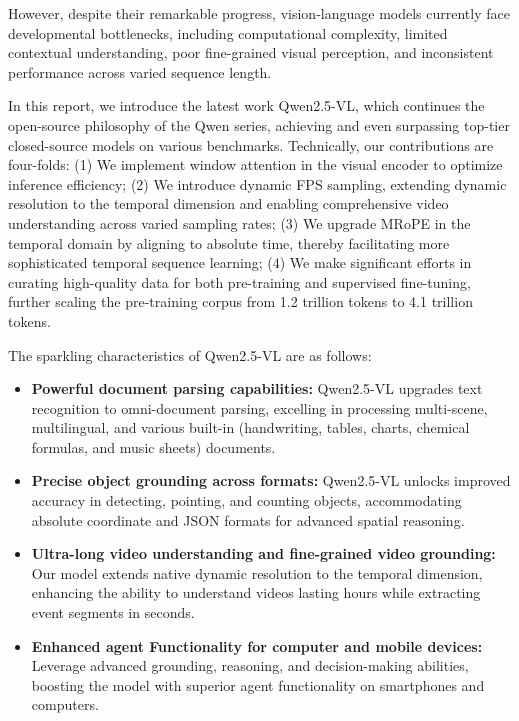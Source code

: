 However, despite their remarkable progress, vision-language models currently face developmental bottlenecks, including computational complexity,  limited contextual understanding, poor fine-grained visual perception, and inconsistent performance across varied sequence length.

In this report, we introduce the latest work Qwen2.5-VL, which continues the open-source philosophy of the Qwen series, achieving and even surpassing top-tier closed-source models on various benchmarks. Technically, our contributions are four-folds: (1) We implement window attention in the visual encoder to optimize inference efficiency; (2) We introduce dynamic FPS sampling, extending dynamic resolution to the temporal dimension and enabling comprehensive video understanding across varied sampling rates; (3) We upgrade MRoPE in the temporal domain by aligning to absolute time, thereby facilitating more sophisticated temporal sequence learning; (4) We make significant efforts in curating high-quality data for both pre-training and supervised fine-tuning, further scaling the pre-training corpus from 1.2 trillion tokens to 4.1 trillion tokens.

The sparkling characteristics of Qwen2.5-VL are as follows:
\begin{itemize}

 \item \textbf{Powerful document parsing capabilities:} Qwen2.5-VL upgrades text recognition to omni-document parsing, excelling in processing multi-scene, multilingual, and various built-in (handwriting, tables, charts, chemical formulas, and music sheets) documents.
 
 \item \textbf{Precise object grounding across formats:} Qwen2.5-VL unlocks improved accuracy in detecting, pointing, and counting objects, accommodating absolute coordinate and JSON formats for advanced spatial reasoning.
 
 \item \textbf{Ultra-long video understanding and fine-grained video grounding:} Our model extends native dynamic resolution to the temporal dimension, enhancing the ability to understand videos lasting hours while extracting event segments in seconds.
 
 \item \textbf{Enhanced agent Functionality for computer and mobile devices:} Leverage advanced grounding, reasoning, and decision-making abilities, boosting the model with superior agent functionality on smartphones and computers.
 
\end{itemize}